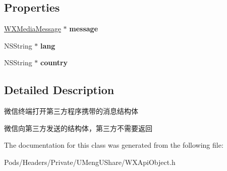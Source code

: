 \subsection*{Properties}
\begin{DoxyCompactItemize}
\item 
\mbox{\label{interface_launch_from_w_x_req_a72b54aaa4f7ca3c84a6e84be6e6dce75}} 
\mbox{\hyperlink{interface_w_x_media_message}{W\+X\+Media\+Message}} $\ast$ {\bfseries message}
\item 
\mbox{\label{interface_launch_from_w_x_req_a3babd7de34d162e3b63c283a8576f5e4}} 
N\+S\+String $\ast$ {\bfseries lang}
\item 
\mbox{\label{interface_launch_from_w_x_req_ac73c9ae74ff9e4f07dc89d2b220c5a89}} 
N\+S\+String $\ast$ {\bfseries country}
\end{DoxyCompactItemize}


\subsection{Detailed Description}
微信终端打开第三方程序携带的消息结构体 

微信向第三方发送的结构体，第三方不需要返回 

The documentation for this class was generated from the following file\+:\begin{DoxyCompactItemize}
\item 
Pods/\+Headers/\+Private/\+U\+Meng\+U\+Share/W\+X\+Api\+Object.\+h\end{DoxyCompactItemize}
